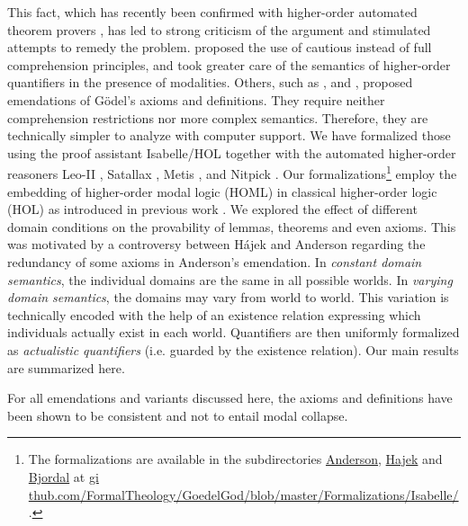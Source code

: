 \documentclass{birkjour}
\theoremstyle{definition}
\theoremstyle{remark}
\numberwithin{equation}{section}
\begin{document}
This fact, which
has recently been confirmed with higher-order automated theorem
provers \citep{C40,J30}, has led to strong criticism of the argument
and stimulated attempts to remedy the problem.
\citet{Hajek_Magari_and_others_1996,Hajek_der_Mathematiker_2001}
proposed the use of cautious instead of full comprehension principles,
and \citet{fitting02:_types_tableaus_god} took
greater care of the semantics of higher-order quantifiers
in the presence of modalities. Others, such as
\citet{anderson90:_some_emend_of_goedel_ontol_proof}, \citet{Hajek2002}
and \citet{bjordal99}, proposed emendations of G\"odel's
axioms and definitions. They require neither comprehension
restrictions nor more complex semantics. Therefore, they are
technically simpler to analyze with computer support. We have
formalized those using the proof assistant Isabelle/HOL \citep{Isabelle}
together with the automated higher-order reasoners Leo-II \citep{C26},
Satallax \citep{brown2012satallax}, Metis
\citep{Hurd03first-orderproof}, and Nitpick \citep{Nitpick}.   Our
formalizations\footnote{The   formalizations are available in the
subdirectories \url{Anderson}, \url{Hajek} and \url{Bjordal} at \url{gi
thub.com/FormalTheology/GoedelGod/blob/master/Formalizations/Isabelle/
}.} employ the embedding of higher-order modal logic (HOML) in
classical higher-order logic (HOL) as introduced in previous work
\citep{C40,J30,J23}. We explored the effect of different domain
conditions on the provability of lemmas, theorems and even axioms.
This was motivated by a controversy between Hájek and Anderson
regarding the redundancy of some axioms in Anderson's emendation. In
\emph{constant domain semantics}, the individual domains are the same
in all possible worlds. In \emph{varying domain semantics}, the
domains may vary from world to world. This variation is technically
encoded with the help of an existence relation expressing which
individuals actually exist in each world. Quantifiers are then
uniformly formalized as \emph{actualistic quantifiers} (i.e. guarded by
the existence relation). Our main results are summarized here.

For all emendations and variants discussed here, the axioms and
definitions have been shown to be consistent and not to entail modal
collapse. 
\end{document}
